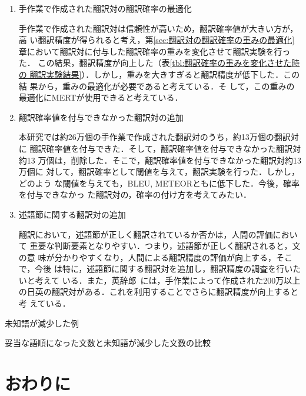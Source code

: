 \documentclass[japanese]{jnlp_1.4}
\begin{document}
\begin{enumerate}

\item{手作業で作成された翻訳対の翻訳確率の最適化}

手作業で作成された翻訳対は信頼性が高いため，翻訳確率値が大きい方が，高
い翻訳精度が得られると考え，第\ref{sec:翻訳対の翻訳確率の重みの最適化}
章において翻訳対に付与した翻訳確率の重みを変化させて翻訳実験を行った．
この結果，翻訳精度が向上した（表\ref{tbl:翻訳確率の重みを変化させた時の
  翻訳実験結果}）．しかし，重みを大きすぎると翻訳精度が低下した．この結
果から，重みの最適化が必要であると考えている．そ
して，この重みの最適化にMERTが使用できると考えている．

\item{翻訳確率値を付与できなかった翻訳対の追加}

本研究では約26万個の手作業で作成された翻訳対のうち，約13万個の翻訳対に
翻訳確率値を付与できた．そして，翻訳確率値を付与できなかった翻訳対約13
万個は，削除した．そこで，翻訳確率値を付与できなかった翻訳対約13万個に
対して，翻訳確率として閾値を与えて，翻訳実験を行った．しかし，どのよう
な閾値を与えても，BLEU, METEORともに低下した．今後，確率を付与できなかっ
た翻訳対の，確率の付け方を考えてみたい．


\item{述語節に関する翻訳対の追加}

翻訳において，述語節が正しく翻訳されているか否かは，人間の評価において
重要な判断要素となりやすい．つまり，述語節が正しく翻訳されると，文の意
味が分かりやすくなり，人間による翻訳精度の評価が向上する，そこで，今後
は特に，述語節に関する翻訳対を追加し，翻訳精度の調査を行いたいと考えて
いる．また，英辞郎~\cite{eijiro}には，手作業によって作成された200万以上
の日英の翻訳対がある．これを利用することでさらに翻訳精度が向上すると考
えている．

\end{enumerate}

\begin{table}[t]
\caption{未知語が減少した例}
\label{tbl:未知語が減少した例 日英翻訳}

\end{table}
\begin{table}[t]
\caption{妥当な語順になった文数と未知語が減少した文数の比較}
\label{tbl:文質が向上した文数と未知語が減少した文数の比較}

\end{table}


\section{おわりに}
\end{document}

